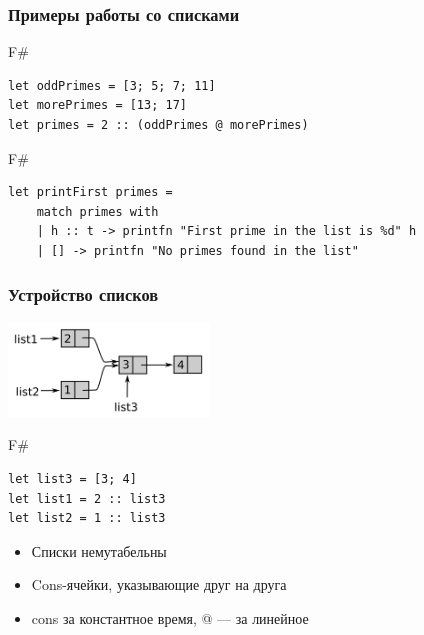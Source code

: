 \documentclass[xetex,mathserif,serif]{beamer}
\begin{document}
	\begin{frame}[fragile]
		\frametitle{Примеры работы со списками}
		\begin{exampleblock}{F\#}
			\begin{lstlisting}
let oddPrimes = [3; 5; 7; 11]
let morePrimes = [13; 17]
let primes = 2 :: (oddPrimes @ morePrimes)
\end{lstlisting}
		\end{exampleblock}
		\begin{exampleblock}{F\#}
			\begin{lstlisting}
let printFirst primes =
    match primes with
    | h :: t -> printfn "First prime in the list is %d" h
    | [] -> printfn "No primes found in the list"			
\end{lstlisting}
		\end{exampleblock}
\end{frame}

	\begin{frame}[fragile]
		\frametitle{Устройство списков}
		\begin{center}
			\includegraphics[width=0.4\textwidth]{lists.png}
		\end{center}
		\begin{exampleblock}{F\#}
			\begin{lstlisting}
let list3 = [3; 4]
let list1 = 2 :: list3
let list2 = 1 :: list3
            \end{lstlisting}
        \end{exampleblock}
		\begin{itemize}
			\item Списки немутабельны
			\item Cons-ячейки, указывающие друг на друга
			\item cons за константное время, @ --- за линейное
		\end{itemize}
\end{frame}
\end{document}
